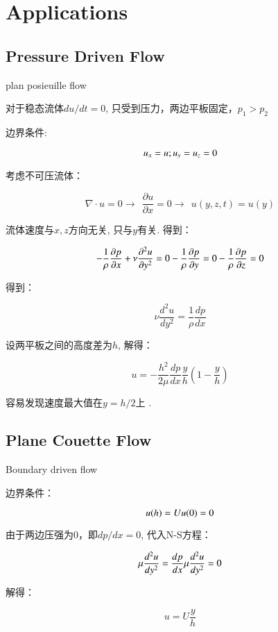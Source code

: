 \documentclass[fontset=windows]{report}
\begin{document}
\chapter{Applications}

\section{Pressure Driven Flow}

plan posieuille flow

对于稳态流体\(du/dt=0\), 只受到压力，两边平板固定，\(p_1>p_2\)

边界条件:

\[u_x=u;\\
u_y=u_z=0\]

考虑不可压流体：

\[\nabla \cdot u =0\longrightarrow\ \ \frac{\partial u}{\partial x}=0\longrightarrow\ \  u(y,z,t)=u(y)\]

流体速度与\(x,z\)方向无关, 只与\(y\)有关. 得到：

\[-\frac{1}{\rho}\frac{\partial p}{\partial x}+\nu\frac{\partial^2 u}{\partial y^2}=0\\
-\frac{1}{\rho}\frac{\partial p}{\partial y}=0\\
-\frac{1}{\rho}\frac{\partial p}{\partial z}=0\]

得到：

\[\nu\frac{d^2u}{dy^2}=\frac{1}{\rho}\frac{dp}{dx}\]

设两平板之间的高度差为\(h\), 解得：

\[u = -\frac{h^2}{2\mu}\frac{dp}{dx}\frac{y}{h}(1-\frac{y}{h})\]

容易发现速度最大值在\(y=h/2\)上 .

\hypertarget{42-plane-couette-flow}{%
\section{Plane Couette Flow}\label{42-plane-couette-flow}}

Boundary driven flow

边界条件：

\[u(h)=U\\
u(0)=0\]

由于两边压强为0，即\(dp/dx=0\), 代入N-S方程：

\[\mu \frac{d^2u}{dy^2}=\frac{dp}{dx}\\
\mu \frac{d^2u}{dy^2}=0\]

解得：

\[u=U\frac{y}{h}\]
\end{document}

